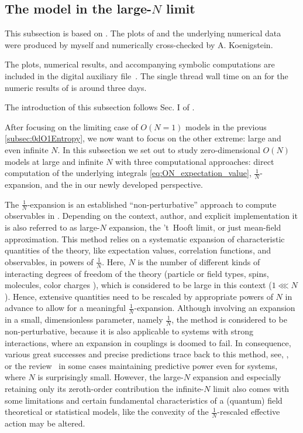 \subsection{The \ON{} model in the large-\texorpdfstring{$N$}{N} limit}\label{subsec:0dLargeN}
\begin{disclaimer}
	This subsection is based on .
	The plots of  and the underlying numerical data were produced by myself and numerically cross-checked by A. Koenigstein.
	
	The plots, numerical results, and accompanying symbolic computations are included in the digital auxiliary file~\cite{Steil:2023zeroDlargeN}.
	The single thread wall time on an \intel{} for the numeric results of  is around three days.
	
	The introduction of this subsection follows Sec. I of .
\end{disclaimer}

After focusing on the limiting case of $O(N=1)$ models in the previous \cref{subsec:0dO1Entropy}, we now want to focus on the other extreme: large and even infinite $N$. 
In this subsection we set out to study zero-dimensional $O(N)$ models at large and infinite $N$ with three computational approaches: direct computation of the underlying integrals \eqref{eq:ON_expectation_value}, $\tfrac{1}{N}$-expansion, and the \frg{} in our newly developed \cfd{} perspective.\bigskip

The $\frac{1}{N}$-expansion is an established ``non-perturbative'' approach to compute observables in \qft{}.
Depending on the context, author, and explicit implementation it is also referred to as large-$N$ expansion, the 't~Hooft limit, or just mean-field approximation.
This method relies on a systematic expansion of characteristic quantities of the theory, like expectation values, correlation functions, and observables, in powers of $\frac{1}{N}$. 
Here, $N$ is the number of different kinds of interacting degrees of freedom of the theory (particle or field types, spins, molecules, color charges \etc{}), which is considered to be large in this context ($1 \lll N$). 
Hence, extensive quantities need to be rescaled by appropriate powers of $N$ in advance to allow for a meaningful $\frac{1}{N}$-expansion.
Although involving an expansion in a small, dimensionless parameter, namely $\frac{1}{N}$, the method is considered to be non-perturbative, because it is also applicable to systems with strong interactions, where an expansion in couplings is doomed to fail.
In consequence, various great successes and precise predictions trace back to this method, see, \eg{},\  or the review~\cite{Moshe:2003xn} \dash{} in some cases maintaining predictive power even for systems, where $N$ is surprisingly small.
However, the large-$N$ expansion and especially retaining only its zeroth-order contribution \dash{} the infinite-$N$ limit \dash{} also comes with some limitations and certain fundamental characteristics of a (quantum) field theoretical or statistical models, like the convexity of the $\tfrac{1}{N}$-rescaled effective action may be altered.

